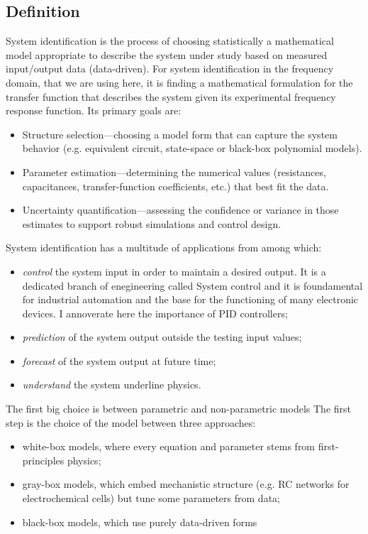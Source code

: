 \subsection{Definition}
System identification is the process of choosing statistically a mathematical model appropriate to describe the system under study based on measured input/output data (data-driven). 
For system identification in the frequency domain, that we are using here, it is finding a mathematical formulation for the transfer function that describes the system given its experimental frequency response function.
Its primary goals are:
\begin{itemize}
	\item Structure selection—choosing a model form that can capture the system behavior (e.g. equivalent circuit, state-space or black-box polynomial models).
	\item Parameter estimation—determining the numerical values (resistances, capacitances, transfer-function coefficients, etc.) that best fit the data.
	\item Uncertainty quantification—assessing the confidence or variance in those estimates to support robust simulations and control design.
\end{itemize}
System identification has a multitude of applications from among which:
\begin{itemize}
	\item \emph{control} the system input in order to maintain a desired output. It is a dedicated branch of enegineering called System control and it is foundamental for industrial automation and the base for the functioning of many electronic devices. I annoverate here the importance of PID controllers;
	\item \emph{prediction} of the system output outside the testing input values;
	\item \emph{forecast} of the system output at future time;
	\item \emph{understand} the system underline physics. 
\end{itemize}
The first big choice is between parametric and non-parametric models
The first step is the choice of the model between three approaches:
\begin{itemize}
	\item white-box models, where every equation and parameter stems from first-principles physics;
	\item gray-box models, which embed mechanistic structure (e.g. RC networks for electrochemical cells) but tune some parameters from data;
	\item black-box models, which use purely data-driven forms
\end{itemize}
